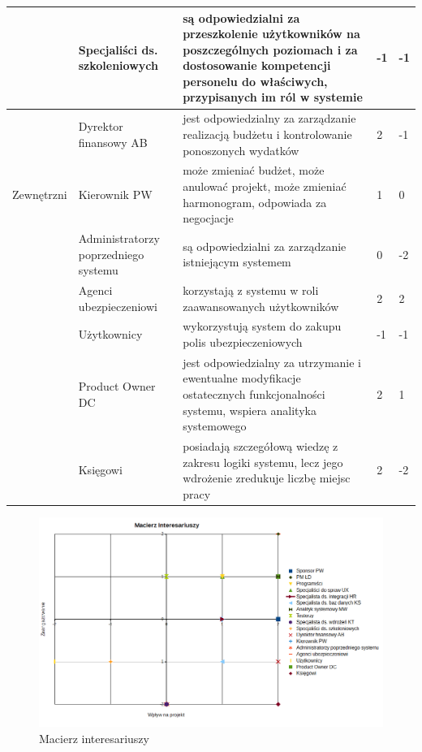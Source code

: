 \documentclass{article}
\begin{document}
\begin{longtable}{|l|L{0.2\textwidth}|L{0.58\textwidth}|C{0.15\textwidth}|C{0.15\textwidth}|}
 & Specjaliści ds. szkoleniowych & są odpowiedzialni za przeszkolenie użytkowników na poszczególnych poziomach i za dostosowanie kompetencji personelu do właściwych, przypisanych im ról w systemie & -1 & -1 \\ \hline
 & Dyrektor finansowy AB & jest odpowiedzialny za zarządzanie realizacją budżetu i kontrolowanie ponoszonych wydatków & 2 & -1 \\ \hline
Zewnętrzni & Kierownik PW & może zmieniać budżet, może anulować projekt, może zmieniać harmonogram, odpowiada za negocjacje & 1 & 0 \\ \hline
 & Administratorzy poprzedniego systemu & są odpowiedzialni za zarządzanie istniejącym systemem & 0 & -2 \\ \hline
 & Agenci ubezpieczeniowi & korzystają z systemu w roli zaawansowanych użytkowników & 2 & 2 \\ \hline
 & Użytkownicy & wykorzystują system do zakupu polis ubezpieczeniowych & -1 & -1 \\ \hline
 & Product Owner DC & jest odpowiedzialny za utrzymanie i ewentualne modyfikacje ostatecznych funkcjonalności systemu, wspiera analityka systemowego & 2 & 1 \\ \hline
 & Księgowi & posiadają szczegółową wiedzę z zakresu logiki systemu, lecz jego wdrożenie zredukuje liczbę miejsc pracy & 2 & -2 \\ \hline
\end{longtable}

\begin{figure}[h]
    \centering
    \includegraphics[scale=0.6]{macierz_interesariuszy.png}
    \caption{Macierz interesariuszy}
\end{figure}
\end{document}
